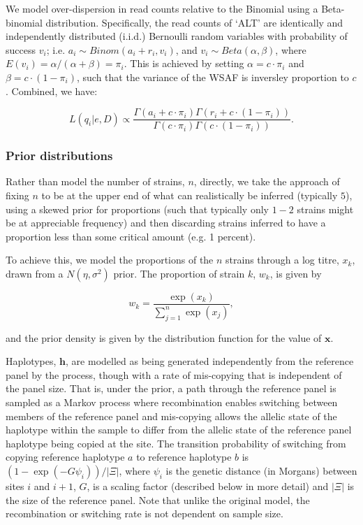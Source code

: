\documentclass{bioinfo}
\begin{document}
\noindent We model over-dispersion in read counts relative to the Binomial using a Beta-binomial distribution. Specifically, the read counts of `ALT' are identically and independently distributed (i.i.d.) Bernoulli random variables with probability of success $v_i$; i.e. $a_i \sim Binom(a_i + r_i, v_i)$, and $v_i \sim Beta(\alpha, \beta)$, where $E(v_i) = \alpha/(\alpha+\beta) = \pi_{i}$. This is achieved by setting $\alpha = c\cdot \pi_{i} $ and $\beta = c\cdot (1-\pi_{i})$, such that the variance of the WSAF is inversley proportion to $c$.  Combined, we have:

\begin{equation}
L(q_{i}| e, D) \propto \frac{\Gamma(a_i + c\cdot \pi_{i}) \Gamma(r_i + c\cdot (1-\pi_{i}))}{\Gamma(c\cdot \pi_{i})\Gamma(c\cdot (1-\pi_{i}))}. \label{eqn:llk}
\end{equation}


\subsubsection{Prior distributions}\label{sec:prior}

Rather than model the number of strains, $n$, directly, we take the approach of fixing $n$ to be at the upper end of what can realistically be inferred (typically $5$), using a skewed prior for proportions (such that typically only $1-2$ strains might be at appreciable frequency) and then discarding strains inferred to have a proportion less than some critical amount (e.g. 1 percent).

To achieve this, we model the proportions of the $n$ strains through a log titre, $x_k$, drawn from a $N(\eta, \sigma^2)$ prior.  The proportion of strain $k$, $w_k$, is given by

\begin{equation}
w_k = \frac{\exp(x_k)}{\sum_{j=1}^n \exp(x_j)},
\end{equation}

\noindent and the prior density is given by the distribution function for the value of $\mathbf{x}$.

Haplotypes, $\mathbf{h}$, are modelled as being generated independently from the reference panel by the \citet{Li2003} process, though with a rate of mis-copying that is independent of the panel size. That is, under the prior, a path through the reference panel is sampled as a Markov process where recombination enables switching between members of the reference panel and mis-copying allows the allelic state of the haplotype within the sample to differ from the allelic state of the reference panel haplotype being copied at the site.  The transition probability of switching from copying reference haplotype $a$ to reference haplotype $b$ is $(1-\exp(-G \psi_i))/|\Xi|$, where $\psi_i$ is the genetic distance (in Morgans) between sites $i$ and $i+1$, $G$, is a scaling factor (described below in more detail) and $|\Xi|$ is the size of the reference panel.  Note that unlike the original model, the recombination or switching rate is not dependent on sample size.
\end{document}
